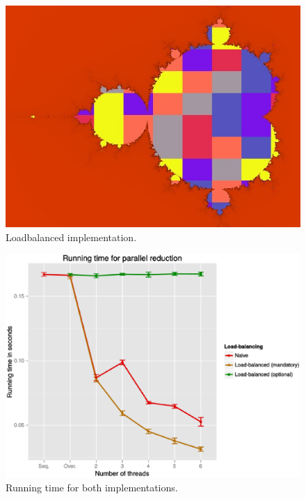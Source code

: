 \documentclass[10pt,twocolumn]{article}
\begin{document}
\begin{figure}[H]
	\begin{center}
		\includegraphics[scale=0.4]{figurer/loadbalance.jpg}
	\end{center}
	\caption{Loadbalanced implementation.}
	\label{fig:loadbalance}
\end{figure}

\begin{figure}[H]
	\begin{center}
		\includegraphics[scale=0.3]{figurer/both_time.eps}
	\end{center}
	\caption{Running time for both implementations.}
	\label{fig:both_time}
\end{figure}
\end{document}

